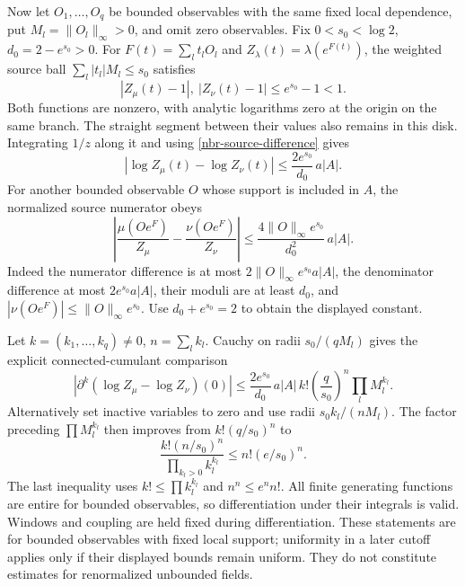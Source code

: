 \documentclass[11pt]{article}
\theoremstyle{remark}
\begin{document}
Now let \(O_1,\ldots,O_q\) be bounded observables with the same fixed
local dependence, put \(M_l=\|O_l\|_\infty>0\), and omit zero
observables. Fix
\(0<s_0<\log2\), \(d_0=2-e^{s_0}>0\).
For \(F(t)=\sum_lt_lO_l\) and
\(Z_\lambda(t)=\lambda(e^{F(t)})\), the weighted source ball
\(\sum_l|t_l|M_l\le s_0\) satisfies
\begin{equation}
 |Z_\mu(t)-1|,\ |Z_\nu(t)-1|\le e^{s_0}-1<1.
 \label{nbr-source-disk}
\end{equation}
Both functions are nonzero, with analytic logarithms zero at the
origin on the same branch. The straight segment between their values
also remains in this disk. Integrating \(1/z\) along it and using
\eqref{nbr-source-difference} gives
\begin{equation}
 |\log Z_\mu(t)-\log Z_\nu(t)|
       \le\frac{2e^{s_0}}{d_0}\,a|A|.
 \label{nbr-log-source}
\end{equation}
For another bounded observable \(O\) whose support is included in
\(A\), the normalized source numerator obeys
\begin{equation}
 \left|\frac{\mu(Oe^F)}{Z_\mu}
             -\frac{\nu(Oe^F)}{Z_\nu}\right|
 \le\frac{4\|O\|_\infty e^{s_0}}{d_0^2}\,a|A|.
 \label{nbr-source-ratio}
\end{equation}
Indeed the numerator difference is at most
\(2\|O\|_\infty e^{s_0}a|A|\), the denominator difference at most
\(2e^{s_0}a|A|\), their moduli are at least \(d_0\), and
\(|\nu(Oe^F)|\le\|O\|_\infty e^{s_0}\). Use
\(d_0+e^{s_0}=2\) to obtain the displayed constant.

Let \(k=(k_1,\ldots,k_q)\ne0\), \(n=\sum_l k_l\).
Cauchy on radii \(s_0/(qM_l)\) gives the explicit connected-cumulant
comparison
\begin{equation}
 \left|\partial^k(\log Z_\mu-\log Z_\nu)(0)\right|
 \le\frac{2e^{s_0}}{d_0}\,a|A|\,
           k!\left(\frac q{s_0}\right)^n\prod_l M_l^{k_l}.
 \label{nbr-cumulant}
\end{equation}
Alternatively set inactive variables to zero and use radii
\(s_0k_l/(nM_l)\). The factor preceding \(\prod M_l^{k_l}\)
then improves from \(k!(q/s_0)^n\) to
\[
 \frac{k!(n/s_0)^n}{\prod_{k_l>0}k_l^{k_l}}
       \le n!(e/s_0)^n.
\]
The last inequality uses \(k!\le\prod k_l^{k_l}\) and
\(n^n\le e^n n!\). All finite generating functions are entire for
bounded observables, so differentiation under their integrals is
valid. Windows and coupling are held fixed during differentiation.
These statements are for bounded observables with fixed local support;
uniformity in a later cutoff applies only if their displayed bounds
remain uniform. They do not constitute estimates for renormalized
unbounded fields.
\end{document}
